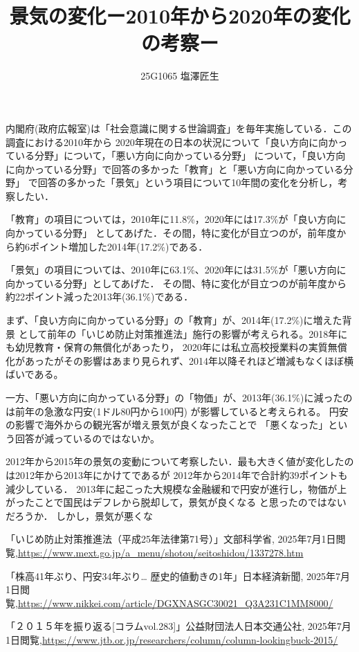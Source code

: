 \documentclass[uplatex,dvipdfmx]{jsarticle}
\begin{document}
\title{景気の変化ー2010年から2020年の変化の考察ー}
\author{25G1065 塩澤匠生}
\maketitle

内閣府(政府広報室)は「社会意識に関する世論調査」を毎年実施している．この調査における2010年から
2020年現在の日本の状況について「良い方向に向かっている分野」について，「悪い方向に向かっている分野」
について，「良い方向に向かっている分野」で回答の多かった「教育」と「悪い方向に向かっている分野」
で回答の多かった「景気」という項目について10年間の変化を分析し，考察したい．

「教育」の項目については，2010年に11.8\%，2020年には17.3\%が「良い方向に向かっている分野」
としてあげた．その間，特に変化が目立つのが，前年度から約6ポイント増加した2014年(17.2\%)である．

「景気」の項目については、2010年に63.1\%、2020年には31.5\%が「悪い方向に向かっている分野」としてあげた．
その間、特に変化が目立つのが前年度から約22ポイント減った2013年(36.1\%)である．

まず、「良い方向に向かっている分野」の「教育」が、2014年(17.2\%)に増えた背景
として前年の「いじめ防止対策推進法」施行の影響が考えられる\cite{ijime}。2018年にも幼児教育・保育の無償化があったり，
2020年には私立高校授業料の実質無償化があったがその影響はあまり見られず、2014年以降それほど増減もなくほぼ横ばいである。

一方、「悪い方向に向かっている分野」の「物価」が、2013年(36.1\%)に減ったのは前年の急激な円安(1ドル80円から100円)
が影響していると考えられる\cite{ennyasu}。
円安の影響で海外からの観光客が増え景気が良くなったことで
「悪くなった」という回答が減っているのではないか。

2012年から2015年の景気の変動について考察したい．最も大きく値が変化したのは2012年から2013年にかけてであるが
2012年から2014年で合計約39ポイントも減少している．
2013年に起こった大規模な金融緩和で円安が進行し，物価が上がったことで国民はデフレから脱却して，景気が良くなる
と思ったのではないだろうか．
しかし，景気が悪くな

\renewcommand{\refname}{注}
\begin{thebibliography}{11}

 「いじめ防止対策推進法（平成25年法律第71号）」文部科学省, 
2025年7月1日閲覧,\url{https://www.mext.go.jp/a_menu/shotou/seitoshidou/1337278.htm}


 「株高41年ぶり、円安34年ぶり… 歴史的値動きの1年」日本経済新聞, 
2025年7月1日閲覧,\url{https://www.nikkei.com/article/DGXNASGC30021_Q3A231C1MM8000/}


 「２０１５年を振り返る[コラムvol.283]」公益財団法人日本交通公社, 
2025年7月1日閲覧,\url{https://www.jtb.or.jp/researchers/column/column-lookingbuck-2015/}


\end{thebibliography}
\end{document}
